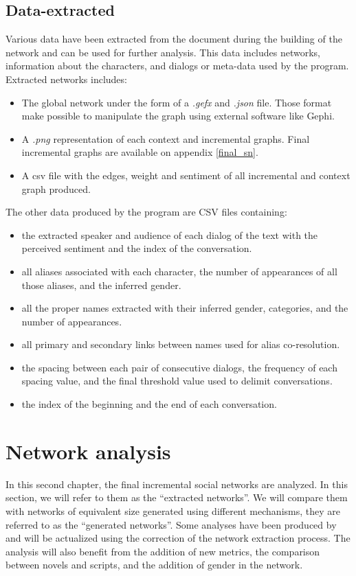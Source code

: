 \documentclass[a4paper, 12pt]{report}
\begin{document}
\newpage
\section{Data-extracted}
Various data have been extracted from the document during the building of the network and can be used for further analysis. This data includes networks, information about the characters, and dialogs or meta-data used by the program.
Extracted networks includes:
\begin{itemize}
\item The global network under the form of a \textit{.gefx} and \textit{.json} file. Those format make possible to manipulate the graph using external software like Gephi.
\item A \textit{.png} representation of each context and incremental graphs. Final incremental graphs are available on appendix \ref{final_sn}.
\item A csv file with the edges, weight and sentiment of all incremental and context graph produced.
\end{itemize}

The other data produced by the program are CSV files containing:
\begin{itemize}
\item the extracted speaker and audience of each dialog of the text with the perceived sentiment and the index of the conversation.
\item all aliases associated with each character, the number of appearances of all those aliases, and the inferred gender.
\item all the proper names extracted with their inferred gender, categories, and the number of appearances.
\item all primary and secondary links between names used for alias co-resolution.
\item the spacing between each pair of consecutive dialogs, the frequency of each spacing value, and the final threshold value used to delimit conversations.
\item the index of the beginning and the end of each conversation.
\end{itemize}








\chapter{Network analysis}
In this second chapter, the final incremental social networks are analyzed. In this section, we will refer to them as the ``extracted networks''.
We will compare them with networks of equivalent size generated using different mechanisms, they are referred to as the ``generated networks''.
Some analyses have been produced by \cite{original} and will be actualized using the correction of the network extraction process.
The analysis will also benefit from the addition of new metrics, the comparison between novels and scripts, and the addition of gender in the network.
\end{document}
